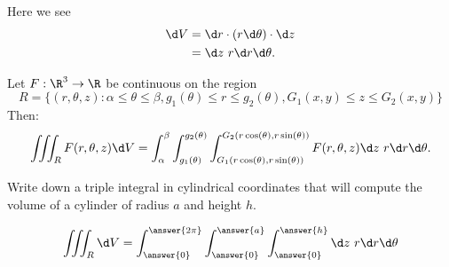 \documentclass{ximera}
\begin{document}
\begin{image}
  \end{image}
Here we see 
\begin{align*}
\d V &= \d r \cdot (r \d \theta)\cdot \d z \\
&= \d z\ r \d r \d \theta.
\end{align*}
\begin{theorem}
  Let $F:\R^3\to\R$ be continuous on the region
  \[
  R=\{(r,\theta,z):\alpha\leq\theta\leq\beta, g_1(\theta)\leq r\leq g_2(\theta), G_1(x,y)\le z\le G_2(x,y)\}
  \]
  Then: 
  \[
  \iiint_R F(r,\theta,z)\d V = \int_\alpha^\beta\int_{g_1(\theta)}^{g_2(\theta)} \int_{G_1(r\cos(\theta),r\sin(\theta))}^{G_2(r\cos(\theta),r\sin(\theta))}F(r,\theta,z) \d z \ r\d r\d \theta.
  \]
\end{theorem}

\begin{question}
  Write down a triple integral in cylindrical coordinates that will
  compute the volume of a cylinder of radius $a$ and height $h$.
  \begin{prompt}
  \[
  \iiint_R \d V = \int_{\answer{0}}^{\answer{2\pi}}
  \int_{\answer{0}}^{\answer{a}}
  \int_{\answer{0}}^{\answer{h}}
  \d z \ r \d r \d \theta 
  \]
  \end{prompt}
\end{question}
\end{document}
